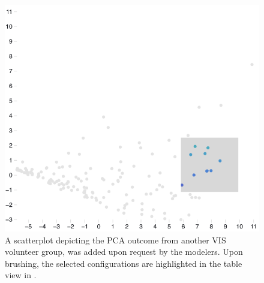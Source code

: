 \documentclass{article}
\begin{document}
\begin{figure}[h!]
    \centering
    \includegraphics[width=\linewidth]{figures/pca.png}
    \caption{A scatterplot depicting the PCA outcome from another VIS volunteer group, was added upon request by the modelers. Upon brushing, the selected configurations are highlighted in the table view in .
    }
    \label{fig:pca}

\end{figure}
\end{document}
